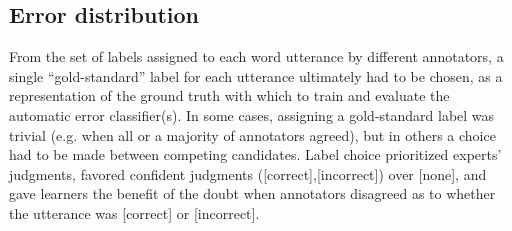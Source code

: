 \documentclass[a4paper]{article}
\newcommand{\TODO}[1]{{\color{red}\textbf{[TODO #1]}}}
\begin{document}
		
		
			
		
		
		\subsection{Error distribution}
		\label{sec:data:errors}
		
		From the set of labels assigned to each word utterance by different annotators, a single ``gold-standard'' label for each utterance ultimately had to be chosen, as a representation of the ground truth with which to train and evaluate the automatic error classifier(s).
		In some cases, assigning a gold-standard label was trivial (e.g. when all or a majority of annotators agreed), but in others
		a choice had to be made between competing candidates.
		Label choice prioritized experts' judgments, favored confident judgments ([correct],[incorrect]) over [none], and gave learners the benefit of the doubt when annotators disagreed as to whether the utterance was [correct] or [incorrect].
	
\end{document}
